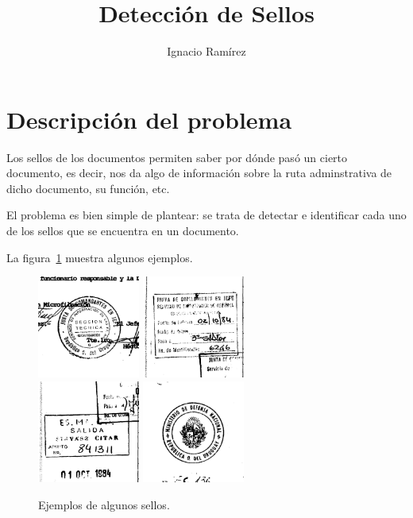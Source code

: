 \documentclass[11pt,a4paper]{article}
\author{Ignacio Ramírez}
\title{Detección de Sellos}
\begin{document}
\maketitle


\section{Descripción del problema}

Los sellos de los documentos permiten saber por dónde pasó un cierto documento, es decir, nos da algo de información sobre la ruta adminstrativa de dicho documento, su función, etc.

El problema es bien simple de plantear: se trata de detectar e identificar cada uno de los sellos que se encuentra en un documento. 

La figura~\ref{fig:sellos} muestra algunos ejemplos.

\begin{figure}[ht]
\centering\includegraphics[width=0.3\textwidth]{sello1.jpg} %
\includegraphics[width=0.3\textwidth]{sello2.jpg}\\
\centering\includegraphics[width=0.3\textwidth]{sello3.jpg} %
\includegraphics[width=0.3\textwidth]{sello4.jpg}
\caption{\label{fig:sellos} Ejemplos de algunos sellos.}
\end{figure}
\end{document}
